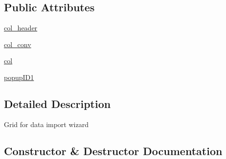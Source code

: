 \subsection*{Public Attributes}
\begin{DoxyCompactItemize}
\item 
\hyperlink{class_uni_dec_1_1unidec__modules_1_1tims__import__wizard_1_1import__wizard__grid_1_1_wizard_grid_a27535e55c70374fe40027522f222647b}{col\+\_\+header}
\item 
\hyperlink{class_uni_dec_1_1unidec__modules_1_1tims__import__wizard_1_1import__wizard__grid_1_1_wizard_grid_aed68d3a4eeffce11350bd39e16624824}{col\+\_\+conv}
\item 
\hyperlink{class_uni_dec_1_1unidec__modules_1_1tims__import__wizard_1_1import__wizard__grid_1_1_wizard_grid_ac9d38d8803ccfc9bc5a410effc99d2f6}{col}
\item 
\hyperlink{class_uni_dec_1_1unidec__modules_1_1tims__import__wizard_1_1import__wizard__grid_1_1_wizard_grid_a020eb728ecb3c25f2165b72479f0a553}{popup\+I\+D1}
\end{DoxyCompactItemize}


\subsection{Detailed Description}
\begin{DoxyVerb}Grid for data import wizard
\end{DoxyVerb}
 

\subsection{Constructor \& Destructor Documentation}
\hypertarget{class_uni_dec_1_1unidec__modules_1_1tims__import__wizard_1_1import__wizard__grid_1_1_wizard_grid_a41bfc7d0eb8f7c066a1b006b3f7b8a6e}{}
